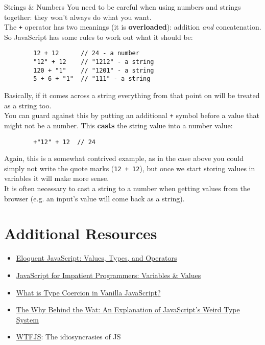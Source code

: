 \begin{infobox}{Strings \& Numbers}
    You need to be careful when using numbers and strings together: they won't always do what you want.
    \\

    The \texttt{+} operator has two meanings (it is \textbf{overloaded}): addition \textit{and} concatenation. So JavaScript has some rules to work out what it should be:

    \begin{verbatim}
        12 + 12      // 24 - a number
        "12" + 12    // "1212" - a string
        120 + "1"    // "1201" - a string
        5 + 6 + "1"  // "111" - a string
    \end{verbatim}

    Basically, if it comes across a string everything from that point on will be treated as a string too.
    \\

    You can guard against this by putting an additional \texttt{+} symbol before a value that might not be a number. This \textbf{casts} the string value into a number value:

    \begin{verbatim}
        +"12" + 12  // 24
    \end{verbatim}

    Again, this is a somewhat contrived example, as in the case above you could simply not write the quote marks (\texttt{12 + 12}), but once we start storing values in variables it will make more sense.
    \\

    It is often necessary to cast a string to a number when getting values from the browser (e.g. an input's value will come back as a string).

\end{infobox}


\section{Additional Resources}

\begin{itemize}[leftmargin=*]
    \item \href{https://eloquentjavascript.net/01_values.html}{Eloquent JavaScript: Values, Types, and Operators}
    \item \href{http://exploringjs.com/impatient-js/ch_variables-assignment.html}{JavaScript for Impatient Programmers: Variables \& Values}
    \item \href{https://gomakethings.com/what-is-type-coercion-in-vanilla-javascript/}{What is Type Coercion in Vanilla JavaScript?}
    \item \href{https://medium.com/dailyjs/the-why-behind-the-wat-an-explanation-of-javascripts-weird-type-system-83b92879a8db}{The Why Behind the Wat: An Explanation of JavaScript's Weird Type System}
    \item \href{https://github.com/denysdovhan/wtfjs}{WTFJS}: The idiosyncrasies of JS
\end{itemize}
